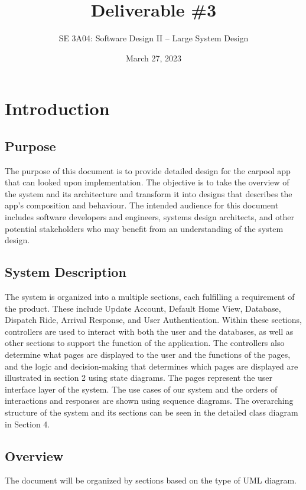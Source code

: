 \documentclass[]{article}
\title{Deliverable \#3}
\author{SE 3A04: Software Design II -- Large System Design}
\date{March 27, 2023}
\begin{document}
\maketitle	

\section{Introduction}
\label{sec:introduction}

\subsection{Purpose}
\label{sub:purpose}
The purpose of this document is to provide detailed design for the carpool app that can looked upon implementation.  The objective is to take the overview of the system and its architecture and transform it into designs that describes the app's composition and behaviour. The intended audience for this document includes software developers and engineers, systems design architects, and other potential stakeholders who may benefit from an understanding of the system design.

\subsection{System Description}
\label{sub:system_description}

The system is organized into a multiple sections, each fulfilling a requirement of the product. These include Update Account, Default Home View, Database, Dispatch Ride, Arrival Response, and User Authentication. Within these sections, controllers are used to interact with both the user and the databases, as well as other sections to support the function of the application. The controllers also determine what pages are displayed to the user and the functions of the pages, and the logic and decision-making that determines which pages are displayed are illustrated in section 2 using state diagrams. The pages represent the user interface layer of the system. The use cases of our system and the orders of interactions and responses are shown using sequence diagrams. The overarching structure of the system and its sections can be seen in the detailed class diagram in Section 4.    




\subsection{Overview}
\label{sub:overview}
The document will be organized by sections based on the type of UML diagram.
\end{document}
